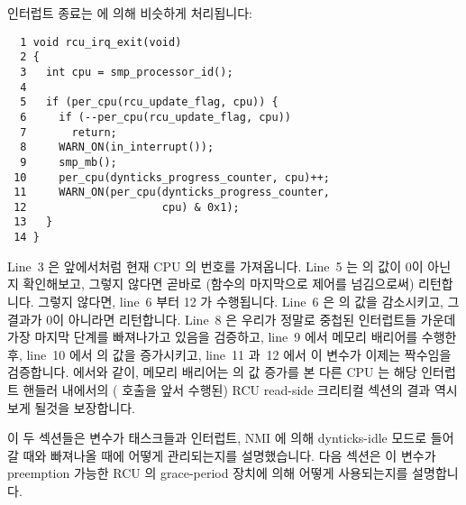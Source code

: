 인터럽트 종료는  에 의해 비슷하게 처리됩니다:
\iffalse

Interrupt exit is handled similarly by
\co{rcu_irq_exit()}:
\fi

{ \scriptsize
\begin{verbatim}
  1 void rcu_irq_exit(void)
  2 {
  3   int cpu = smp_processor_id();
  4
  5   if (per_cpu(rcu_update_flag, cpu)) {
  6     if (--per_cpu(rcu_update_flag, cpu))
  7       return;
  8     WARN_ON(in_interrupt());
  9     smp_mb();
 10     per_cpu(dynticks_progress_counter, cpu)++;
 11     WARN_ON(per_cpu(dynticks_progress_counter,
 12                     cpu) & 0x1);
 13   }
 14 }
\end{verbatim}
}

Line~3 은 앞에서처럼 현재 CPU 의 번호를 가져옵니다.
Line~5 는  의 값이 0이 아닌지 확인해보고, 그렇지 않다면
곧바로 (함수의 마지막으로 제어를 넘김으로써) 리턴합니다.
그렇지 않다면, line~6 부터 12 가 수행됩니다.
Line~6 은  의 값을 감소시키고, 그 결과가 0이 아니라면
리턴합니다.
Line~8 은 우리가 정말로 중첩된 인터럽트들 가운데 가장 마지막 단계를 빠져나가고
있음을 검증하고, line~9 에서 메모리 배리어를 수행한 후, line~10 에서
 의 값을 증가시키고, line~11 과~12 에서 이 변수가
이제는 짝수임을 검증합니다.
 에서와 같이, 메모리 배리어는
 의 값 증가를 본 다른 CPU 는 해당 인터럽트 핸들러
내에서의 ( 호출을 앞서 수행된) RCU read-side 크리티컬 섹션의
결과 역시 보게 될것을 보장합니다.
\iffalse

Line~3 fetches the current CPU's number, as before.
Line~5 checks to see if the \co{rcu_update_flag} is
non-zero, returning immediately (via falling off the end of the
function) if not.
Otherwise, lines~6 through~12 come into play.
Line~6 decrements \co{rcu_update_flag}, returning
if the result is not zero.
Line~8 verifies that we are indeed leaving the outermost
level of nested interrupts, line~9 executes a memory barrier,
line~10 increments \co{dynticks_progress_counter},
and lines~11 and~12 verify that this variable is now even.
As with \co{rcu_enter_nohz()}, the memory barrier ensures that
any other CPU that sees the increment of
\co{dynticks_progress_counter}
will also see the effects of an RCU read-side critical section
in the interrupt handler (preceding the \co{rcu_irq_exit()}
invocation).
\fi

이 두 섹션들은  변수가 태스크들과 인터럽트, NMI
에 의해 dynticks-idle 모드로 들어갈 때와 빠져나올 때에 어떻게 관리되는지를
설명했습니다.
다음 섹션은 이 변수가 preemption 가능한 RCU 의 grace-period 장치에 의해 어떻게
사용되는지를 설명합니다.
\iffalse

